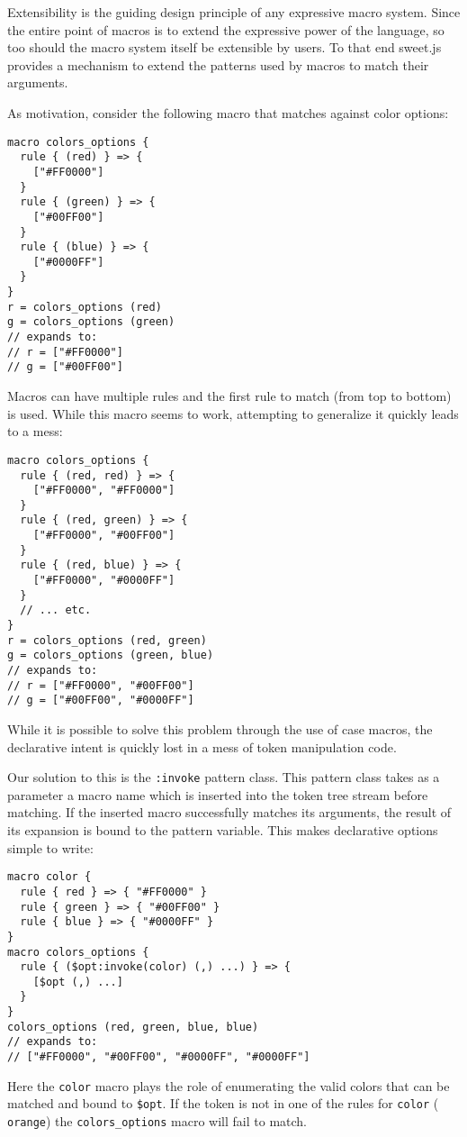 \documentclass[preprint,10pt]{sigplanconf}
\begin{document}
Extensibility is the guiding design principle of any expressive macro
system. Since the entire point of macros is to extend the expressive
power of the language, so too should the macro system itself be
extensible by users. To that end sweet.js provides a mechanism to
extend the patterns used by macros to match their arguments.

As motivation, consider the following macro that matches against
color options:
\begin{lstlisting}
macro colors_options {
  rule { (red) } => {
    ["#FF0000"]
  }
  rule { (green) } => {
    ["#00FF00"]
  }
  rule { (blue) } => {
    ["#0000FF"]
  }
}
r = colors_options (red)
g = colors_options (green)
// expands to:
// r = ["#FF0000"]
// g = ["#00FF00"]
\end{lstlisting}
Macros can have multiple rules and the first rule to match (from top
to bottom) is used. While this macro seems to work, attempting to
generalize it quickly leads to a mess:
\begin{lstlisting}
macro colors_options {
  rule { (red, red) } => {
    ["#FF0000", "#FF0000"]
  }
  rule { (red, green) } => {
    ["#FF0000", "#00FF00"]
  }
  rule { (red, blue) } => {
    ["#FF0000", "#0000FF"]
  }
  // ... etc.
}
r = colors_options (red, green)
g = colors_options (green, blue)
// expands to:
// r = ["#FF0000", "#00FF00"]
// g = ["#00FF00", "#0000FF"]
\end{lstlisting}
While it is possible to solve this problem through the use of case
macros, the declarative intent is quickly lost in a mess of 
token manipulation code.

Our solution to this is the \lstinline!:invoke! pattern class.
This pattern class takes as a parameter a macro name which is inserted
into the token tree stream before matching. If the inserted macro
successfully matches its arguments, the result of its expansion is
bound to the pattern variable. This makes declarative options simple
to write:
\begin{lstlisting}
macro color {
  rule { red } => { "#FF0000" }
  rule { green } => { "#00FF00" }
  rule { blue } => { "#0000FF" }
}
macro colors_options {
  rule { ($opt:invoke(color) (,) ...) } => { 
    [$opt (,) ...]
  }
}
colors_options (red, green, blue, blue)
// expands to:
// ["#FF0000", "#00FF00", "#0000FF", "#0000FF"]
\end{lstlisting}
Here the \lstinline!color! macro plays the role of enumerating the
valid colors that can be matched and bound to \lstinline!$opt!.
If the token is not in one of the rules for \lstinline!color! (\eg
\lstinline!orange!) the \lstinline!colors_options! macro will fail to match.
\end{document}
